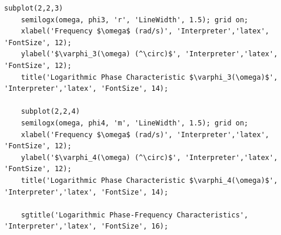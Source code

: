 \documentclass[a4paper, 12pt]{article}
\begin{document}
\begin{lstlisting}[label=task1, caption={Программа для задания 1}]
    subplot(2,2,3)
    semilogx(omega, phi3, 'r', 'LineWidth', 1.5); grid on;
    xlabel('Frequency $\omega$ (rad/s)', 'Interpreter','latex', 'FontSize', 12);
    ylabel('$\varphi_3(\omega) (^\circ)$', 'Interpreter','latex', 'FontSize', 12);
    title('Logarithmic Phase Characteristic $\varphi_3(\omega)$', 'Interpreter','latex', 'FontSize', 14);

    subplot(2,2,4)
    semilogx(omega, phi4, 'm', 'LineWidth', 1.5); grid on;
    xlabel('Frequency $\omega$ (rad/s)', 'Interpreter','latex', 'FontSize', 12);
    ylabel('$\varphi_4(\omega) (^\circ)$', 'Interpreter','latex', 'FontSize', 12);
    title('Logarithmic Phase Characteristic $\varphi_4(\omega)$', 'Interpreter','latex', 'FontSize', 14);

    sgtitle('Logarithmic Phase-Frequency Characteristics', 'Interpreter','latex', 'FontSize', 16);
    \end{lstlisting}
\end{document}

